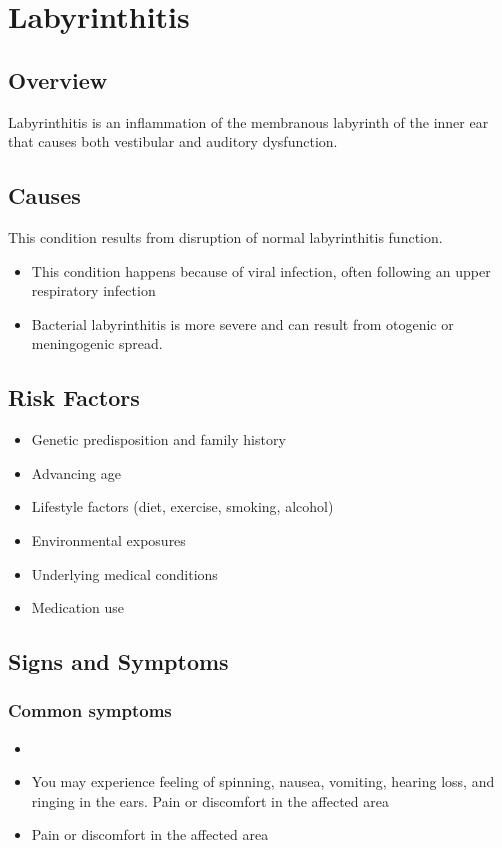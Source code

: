 \chapter{Labyrinthitis}
\label{sec:Labyrinthitis}

\section{Overview}
Labyrinthitis is an inflammation of the membranous labyrinth of the inner ear that causes both vestibular and auditory dysfunction.
\section{Causes}
This condition results from disruption of normal labyrinthitis function.

\begin{itemize}[noitemsep]
  \item This condition happens because of viral infection, often following an upper respiratory infection
  \item Bacterial labyrinthitis is more severe and can result from otogenic or meningogenic spread.
\end{itemize}
\section{Risk Factors}


\begin{itemize}[noitemsep]
  \item Genetic predisposition and family history
  \item Advancing age
  \item Lifestyle factors (diet, exercise, smoking, alcohol)
  \item Environmental exposures
  \item Underlying medical conditions
  \item Medication use
\end{itemize}
\section{Signs and Symptoms}

\subsection{Common symptoms}
\begin{itemize}[noitemsep]
  \item \item You may experience feeling of spinning, nausea, vomiting, hearing loss, and ringing in the ears. Pain or discomfort in the affected area    \item Pain or discomfort in the affected area
  \end{itemize}

